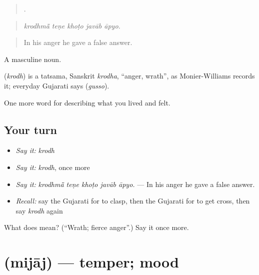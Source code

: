 \begin{quote}
    .
\end{quote}

\begin{quote}
\emph{krodhmā̃ teṇe khoṭo javāb āpyo.}
\end{quote}

\begin{quote}
In his anger he gave a false answer.
\end{quote}

A masculine noun.

\begin{cousinweb}
\textbf{} (\emph{krodh}) is a tatsama, Sanskrit \emph{krodha}, \textquotedblleft{}anger, wrath\textquotedblright{}, as Monier-Williams records it; everyday Gujarati says \textbf{} (\emph{gusso}).
\end{cousinweb}

\begin{grammarlens}[title={What you've built}]
One more word for describing what you lived and felt.
\end{grammarlens}

\subsection*{Your turn}
\begin{itemize}
\raggedright
  \item \emph{Say it:} \emph{krodh}
  \item \emph{Say it:} \emph{krodh}, once more
  \item \emph{Say it:} \emph{krodhmā̃ teṇe khoṭo javāb āpyo.} — In his anger he gave a false answer.
  \item \emph{Recall:} say the Gujarati for to clasp, then the Gujarati for to get cross, then say \emph{krodh} again
\end{itemize}

\begin{tcolorbox}[breakable,colback=teal!4,colframe=teal!35!black,title={Before you move on}]
What does  mean? (\textquotedblleft{}Wrath; fierce anger\textquotedblright{}.) Say it once more.
\end{tcolorbox}
\section[\texorpdfstring{\gu{મિજાજ} (mijāj)}{મિજાજ (mijāj)}]{ (mijāj) — temper; mood}

